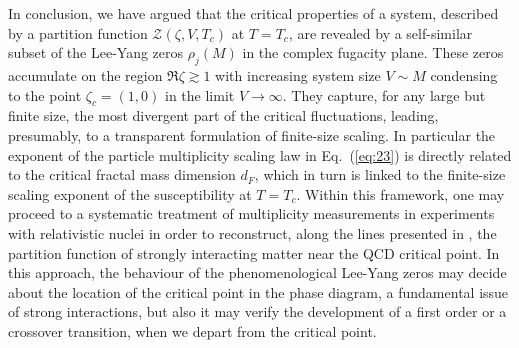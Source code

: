 \documentclass[aps,pre,showpacs,amsmath,amssymb,superscriptaddress,twocolumn]{revtex4-1}
\begin{document}

In conclusion, we have argued that the critical properties of a system, described by a partition function $\mathcal{Z}(\zeta,V,T_c)$ at $T=T_c$, are revealed by a self-similar subset of the Lee-Yang zeros $\rho_j(M)$ in the complex fugacity plane. These zeros accumulate on the region $\Re \zeta \gtrsim 1$ with increasing system size $V \sim M$ condensing to the point $\zeta_c=(1,0)$ in the limit $V \to \infty$. They capture, for any large but finite size, the most divergent part of the critical fluctuations, leading, presumably, to a transparent formulation of finite-size scaling. In particular the exponent of the particle multiplicity scaling law in Eq.~(\ref{eq:23}) is directly related to the critical fractal mass dimension $d_F$, which in turn is linked to the finite-size scaling exponent of the susceptibility at $T=T_c$. Within this framework, one may 
proceed to a systematic treatment of multiplicity measurements in experiments with relativistic nuclei in order to reconstruct, along the lines presented in \cite{Nakamura2016}, the partition function of strongly interacting matter near the QCD critical point. In this approach, the behaviour of the phenomenological Lee-Yang zeros may decide about the location of the critical point in the phase diagram, a fundamental issue of strong interactions, but also it may verify the development of a first order  or a crossover transition, when we depart from the critical point.
\end{document}
